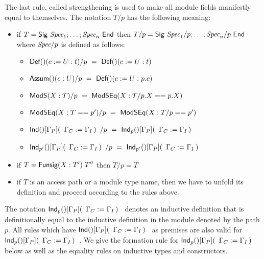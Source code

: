 The last rule, called strengthening is used to make all module fields
manifestly equal to themselves. The notation $T/p$ has the following
meaning:
\begin{itemize}
\item if $T=\sig{\Spec_1;\dots;\Spec_n}$ then
  $T/p=\sig{\Spec_1/p;\dots;\Spec_n/p}$ where $\Spec/p$ is defined as
  follows:
  \begin{itemize}
  \item $\Def{}{c}{U}{t}/p ~=~ \Def{}{c}{U}{t}$
  \item $\Assum{}{c}{U}/p ~=~ \Def{}{c}{U}{p.c}$
  \item $\ModS{X}{T}/p ~=~ \ModSEq{X}{T/p.X}{p.X}$
  \item $\ModSEq{X}{T}{p'}/p ~=~ \ModSEq{X}{T/p}{p'}$
  \item $\Ind{}{\Gamma_P}{\Gamma_C}{\Gamma_I}/p ~=~ \Indp{}{\Gamma_P}{\Gamma_C}{\Gamma_I}{p}$
  \item $\Indp{}{\Gamma_P}{\Gamma_C}{\Gamma_I}{p'}/p ~=~ \Indp{}{\Gamma_P}{\Gamma_C}{\Gamma_I}{p'}$
  \end{itemize}
\item if $T=\funsig{X}{T'}{T''}$ then $T/p=T$
\item if $T$ is an access path or a module type name, then we have to
  unfold its definition and proceed according to the rules above. 
\end{itemize}
The notation $\Indp{}{\Gamma_P}{\Gamma_C}{\Gamma_I}{p}$ denotes an
inductive definition that is definitionally equal to the inductive
definition in the module denoted by the path $p$. All rules which have
$\Ind{}{\Gamma_P}{\Gamma_C}{\Gamma_I}$ as premises are also valid for 
$\Indp{}{\Gamma_P}{\Gamma_C}{\Gamma_I}{p}$. We give the formation rule
for $\Indp{}{\Gamma_P}{\Gamma_C}{\Gamma_I}{p}$ below as well as
the equality rules on inductive types and constructors. 

